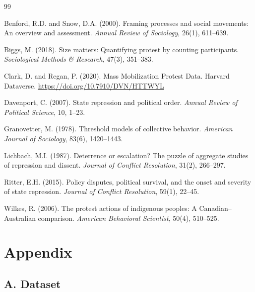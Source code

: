 \documentclass[12pt,a4paper]{article}
\begin{document}
\begin{thebibliography}{99}

Benford, R.D. and Snow, D.A. (2000).
\newblock Framing processes and social movements: An overview and assessment.
\newblock \emph{Annual Review of Sociology}, 26(1), 611--639.

Biggs, M. (2018).
\newblock Size matters: Quantifying protest by counting participants.
\newblock \emph{Sociological Methods \& Research}, 47(3), 351--383.

Clark, D. and Regan, P. (2020).
\newblock Mass Mobilization Protest Data.
\newblock Harvard Dataverse. \url{https://doi.org/10.7910/DVN/HTTWYL}

Davenport, C. (2007).
\newblock State repression and political order.
\newblock \emph{Annual Review of Political Science}, 10, 1--23.

Granovetter, M. (1978).
\newblock Threshold models of collective behavior.
\newblock \emph{American Journal of Sociology}, 83(6), 1420--1443.

Lichbach, M.I. (1987).
\newblock Deterrence or escalation? The puzzle of aggregate studies of repression and dissent.
\newblock \emph{Journal of Conflict Resolution}, 31(2), 266--297.

Ritter, E.H. (2015).
\newblock Policy disputes, political survival, and the onset and severity of state repression.
\newblock \emph{Journal of Conflict Resolution}, 59(1), 22--45.

Wilkes, R. (2006).
\newblock The protest actions of indigenous peoples: A Canadian--Australian comparison.
\newblock \emph{American Behavioral Scientist}, 50(4), 510--525.

\end{thebibliography}

\newpage
\section*{Appendix}

\subsection*{A. Dataset}
\end{document}
